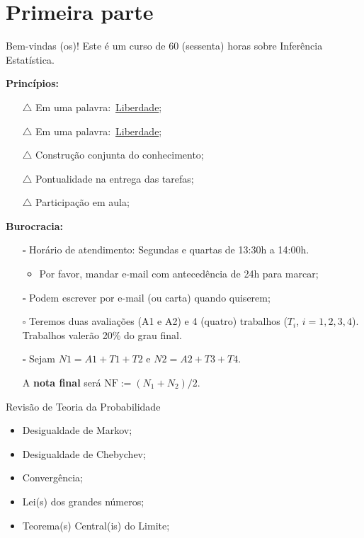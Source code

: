 \section*{Primeira parte}
\begin{frame}[t,plain]
\titlepage
\end{frame}
\begin{frame}{Bem-vindas (os)!}
Este é um curso de 60 (sessenta) horas sobre Inferência Estatística.

\textbf{Princípios:}
\begin{itemize}
  \item[$\triangle$] Em uma palavra:~\underline{Liberdade};
  \item[$\triangle$] Em uma palavra:~\underline{Liberdade};
  \item[$\triangle$] Construção conjunta do conhecimento;
  \item[$\triangle$] Pontualidade na entrega das tarefas;
  \item[$\triangle$] Participação em aula;
\end{itemize}

\textbf{Burocracia:}
\begin{itemize}
 \item[$\square$] Horário de atendimento: Segundas e quartas de 13:30h a 14:00h.
 \begin{itemize}
  \item  Por favor, mandar e-mail com antecedência de 24h para marcar;
  \end{itemize} 
 \item[$\square$] Podem escrever por e-mail (ou carta) quando quiserem;
 \item[$\square$] Teremos duas avaliações (A1 e A2) e 4 (quatro) trabalhos ($T_i$, $i = 1,2,3,4$).
 Trabalhos valerão 20\% do grau final.
 \item[$\square$] Sejam $N1 = A1 + T1 + T2$ e $N2 = A2 + T3 + T4$.
 
A \textbf{nota final} será $\text{NF} := (N_1 + N_2)/2$.
\end{itemize}
\end{frame}
\begin{frame}{Revisão de Teoria da Probabilidade}
\begin{itemize}
 \item Desigualdade de Markov;
 \item Desigualdade de Chebychev;
  \item Convergência;
 \item Lei(s) dos grandes números;
 \item Teorema(s) Central(is) do Limite;
\end{itemize}
\end{frame}
